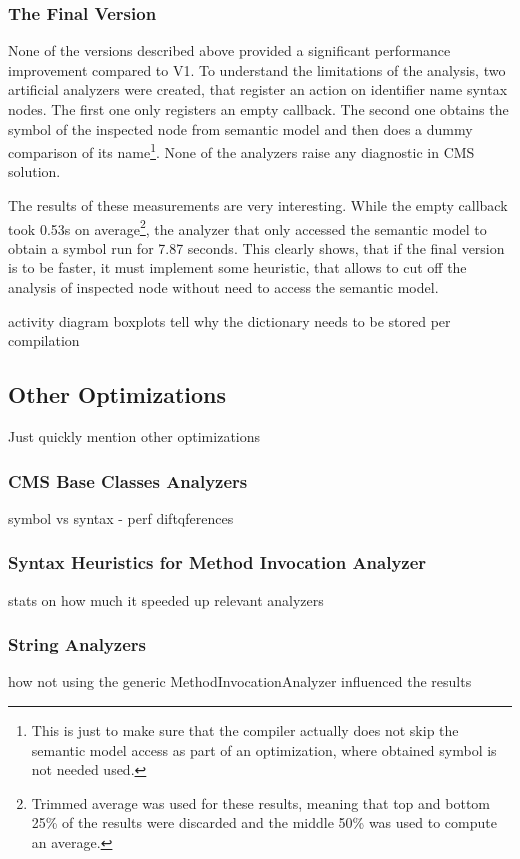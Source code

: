 \documentclass[
  digital, %
  table,   %
  lof,     %
  lot,     %
  oneside,
]{fithesis3}
\begin{document}
\subsubsection{\textbf{The Final Version}}
None of the versions described above provided a significant performance improvement compared to V1. To understand the limitations of the analysis, two artificial analyzers were created, that register an action on identifier name syntax nodes. The first one only registers an empty callback. The second one obtains the symbol of the inspected node from semantic model and then does a dummy comparison of its name\footnote{This is just to make sure that the compiler actually does not skip the semantic model access as part of an optimization, where obtained symbol is not needed used.}. None of the analyzers raise any diagnostic in CMS solution. 

The results of these measurements are very interesting. While the empty callback took 0.53s on average\footnote{Trimmed average was used for these results, meaning that top and bottom 25\% of the results were discarded and the middle 50\% was used to compute an average.}, the analyzer that only accessed the semantic model to obtain a symbol run for 7.87 seconds. This clearly shows, that if the final version is to be faster, it must implement some heuristic, that allows to cut off the analysis of inspected node without need to access the semantic model.


activity diagram
boxplots
tell why the dictionary needs to be stored per compilation
\subsection{Other Optimizations}
Just quickly mention other optimizations 

\subsubsection{\textbf{CMS Base Classes Analyzers}}
symbol vs syntax - perf diftqferences

\subsubsection{\textbf{Syntax Heuristics for Method Invocation Analyzer}}
stats on how much it speeded up relevant analyzers

\subsubsection{\textbf{String Analyzers}}
how not using the generic MethodInvocationAnalyzer influenced the results
\end{document}
